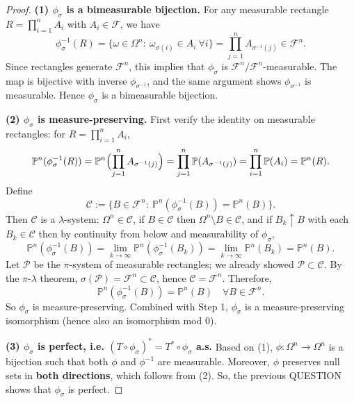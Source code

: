 \documentclass[12pt]{article}
\renewcommand{\(}{\left(}%
\renewcommand{\)}{\right)}%
\renewcommand{\[}{\left[}%
\renewcommand{\]}{\right]}%
\newtheorem{proof}{Proof.}}
\begin{document}
\begin{proof}
\noindent \textbf{(1) $\phi_\sigma$ is a bimeasurable bijection.}
For any measurable rectangle $R=\prod_{i=1}^n A_i$ with $A_i\in\mathscr F$, we have
\begin{equation*}
\phi_\sigma^{-1}(R)
=\{ \omega\in\Omega^n:\ \omega_{\sigma(i)}\in A_i\ \forall i\}
=\prod_{j=1}^n A_{\sigma^{-1}(j)}\in \mathscr F^{n}.
\end{equation*}
Since rectangles generate $\mathscr F^{n}$, this implies that $\phi_\sigma$ is
$\mathscr F^{n}/\mathscr F^{n}$-measurable. The map is bijective with
inverse $\phi_{\sigma^{-1}}$, and the same argument shows $\phi_{\sigma^{-1}}$ is measurable.
Hence $\phi_\sigma$ is a bimeasurable bijection.

\medskip
\noindent \textbf{(2) $\phi_\sigma$ is measure-preserving.}
First verify the identity on measurable rectangles:
for $R=\prod_{i=1}^n A_i$,
\begin{equation*}
\mathbb P^{n}(\phi_\sigma^{-1}(R))
=\mathbb P^{n}\Bigl(\prod_{j=1}^n A_{\sigma^{-1}(j)}\Bigr)
=\prod_{j=1}^n \mathbb P(A_{\sigma^{-1}(j)})
=\prod_{i=1}^n \mathbb P(A_i)
=\mathbb P^{n}(R).
\end{equation*}
Define
\begin{equation*}
\mathcal C:=\bigl\{B\in\mathscr F^{n}:\ \mathbb P^{n}(\phi_\sigma^{-1}(B))
=\mathbb P^{n}(B)\bigr\}.
\end{equation*}
Then $\mathcal C$ is a $\lambda$-system: $\Omega^n\in\mathcal C$, if $B\in\mathcal C$ then
$\Omega^n\setminus B\in\mathcal C$, and if $B_k\uparrow B$ with each $B_k\in\mathcal C$ then
by continuity from below and measurability of $\phi_\sigma$,
\begin{equation*}
\mathbb P^{n}(\phi_\sigma^{-1}(B))
=\lim_{k\to\infty}\mathbb P^{n}(\phi_\sigma^{-1}(B_k))
=\lim_{k\to\infty}\mathbb P^{n}(B_k)
=\mathbb P^{n}(B).
\end{equation*}
Let $\mathcal P$ be the $\pi$-system of measurable rectangles; we already showed
$\mathcal P\subset\mathcal C$. By the $\pi$-$\lambda$ theorem,
$\sigma(\mathcal P)=\mathscr F^{n}\subset\mathcal C$, hence $\mathcal C=\mathscr F^{n}$.
Therefore,
\begin{equation*}
\mathbb P^{n}(\phi_\sigma^{-1}(B))=\mathbb P^{n}(B)
\quad\forall B\in\mathscr F^{n}.
\end{equation*}
So $\phi_\sigma$ is measure-preserving. Combined with Step 1, $\phi_\sigma$ is a
measure-preserving isomorphism (hence also an isomorphism mod $0$).

\medskip
\noindent \textbf{(3) $\phi_\sigma$ is perfect, i.e. $(T\circ\phi_\sigma)^* = T^*\circ\phi_\sigma$ a.s.} Based on (1), $\phi:\Omega^n \to \Omega^n$ is a bijection such that both $\phi$ and $\phi^{-1}$ are measurable. Moreover, $\phi$ preserves null sets in {\bfseries both directions}, which follows from (2). So, the previous QUESTION shows that $\phi_\sigma$ is perfect.


\end{proof}
\end{document}
